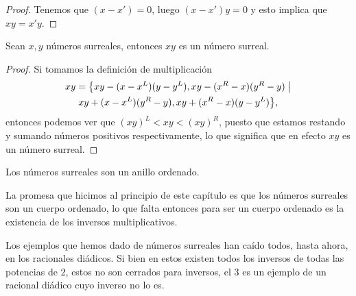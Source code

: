     \begin{proof}
        Tenemos que $(x-x') = 0$, luego $(x-x')y = 0$ y esto implica que $xy = x'y$.
    \end{proof}

    \begin{corollary}
        Sean $x, y$ n\'umeros surreales, entonces $xy$ es un n\'umero surreal.
    \end{corollary}

    \begin{proof}
        Si tomamos la definici\'on de multiplicaci\'on
        \begin{multline*}
            xy = \big\{xy-(x-x^L)(y-y^L),xy-(x^R-x)(y^R-y)\;\big|\\
            \break xy+(x-x^L)(y^R-y), xy+(x^R-x)(y-y^L)\big\},
        \end{multline*}
        entonces podemos ver que $(xy)^L < xy < (xy)^R$, puesto que estamos restando y sumando n\'umeros positivos respectivamente, lo que significa que en efecto $xy$ es un n\'umero surreal.
    \end{proof}

    \begin{corollary}
        Los n\'umeros surreales son un anillo ordenado.
    \end{corollary}

    La promesa que hicimos al principio de este cap\'itulo es que los n\'umeros surreales son un cuerpo ordenado, lo que falta entonces para ser un cuerpo ordenado es la existencia de los inversos multiplicativos.

    Los ejemplos que hemos dado de n\'umeros surreales han ca\'ido todos, hasta ahora, en los racionales di\'adicos. Si bien en estos existen todos los inversos de todas las potencias de $2$, estos no son cerrados para inversos, el $3$ es un ejemplo de un racional di\'adico cuyo inverso no lo es.


